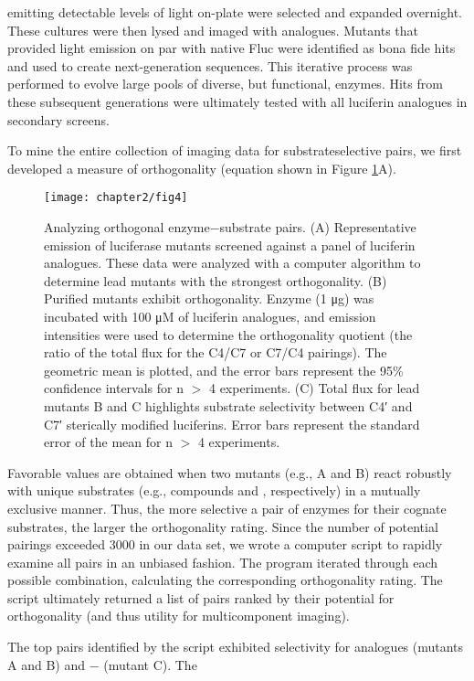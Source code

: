 emitting detectable levels of light on-plate were selected and
expanded overnight. These cultures were then lysed and
imaged with analogues. Mutants that provided light emission
on par with native Fluc were identified as bona fide hits and used to create next-generation sequences. This iterative process
was performed to evolve large pools of diverse, but functional,
enzymes. Hits from these subsequent generations were
ultimately tested with all luciferin analogues in secondary
screens.
\par
To mine the entire collection of imaging data for substrateselective
pairs, we first developed a measure of orthogonality
(equation shown in Figure \ref{fig:mining_verifying}A).
\begin{figure}[htbp]
\texttt{[image: chapter2/fig4]}
\centering
\caption[Analyzing orthogonal enzyme−substrate pairs]{Analyzing orthogonal enzyme−substrate pairs. (A) Representative emission of luciferase mutants screened against a panel of luciferin
analogues. These data were analyzed with a computer algorithm to determine lead mutants with the strongest orthogonality. (B) Purified mutants
exhibit orthogonality. Enzyme (1 μg) was incubated with 100 μM of luciferin analogues, and emission intensities were used to determine the
orthogonality quotient (the ratio of the total flux for the C4/C7 or C7/C4 pairings). The geometric mean is plotted, and the error bars represent the
95\% confidence intervals for n $>$ 4 experiments. (C) Total flux for lead mutants B and C highlights substrate selectivity between C4′ and C7′
sterically modified luciferins. Error bars represent the standard error of the mean for n $>$ 4 experiments.}
  \label{fig:mining_verifying}
\end{figure}
Favorable values are obtained
when two mutants (e.g., A and B) react robustly with unique
substrates (e.g., compounds  and , respectively) in a mutually
exclusive manner. Thus, the more selective a pair of enzymes
for their cognate substrates, the larger the orthogonality rating.
Since the number of potential pairings exceeded 3000 in our
data set, we wrote a computer script to rapidly examine all pairs
in an unbiased fashion. The program iterated through each
possible combination, calculating the corresponding orthogonality
rating. The script ultimately returned a list of pairs ranked
by their potential for orthogonality (and thus utility for
multicomponent imaging).
\par
The top pairs identified by the script exhibited selectivity for
analogues  (mutants A and B) and − (mutant C). The
